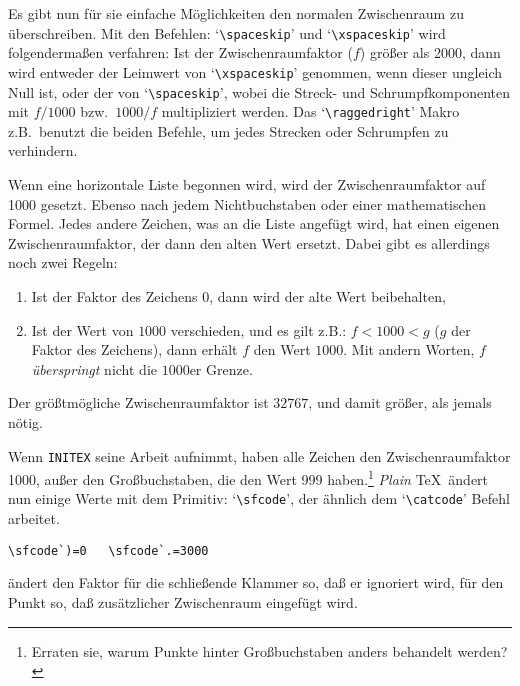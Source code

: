 Es gibt nun f\"ur sie einfache M\"oglichkeiten den normalen Zwischenraum
zu \"uberschreiben. Mit den Befehlen: 
`\verb|\spaceskip|' und `\verb|\xspaceskip|' wird folgenderma\ss{}en verfahren:
Ist der
Zwischenraumfaktor ($f$) gr\"o\ss{}er als 2000, dann wird entweder der
Leimwert von 
`\verb|\xspaceskip|' genommen, wenn dieser ungleich Null
ist, oder der von `\verb|\spaceskip|', wobei die Streck- und
Schrumpfkomponenten mit $f/1000$ bzw.\ $1000/f$ multipliziert werden.
Das 
`\verb|\raggedright|' Makro z.B.\ benutzt die beiden Befehle, um
jedes Strecken oder Schrumpfen zu verhindern.

Wenn eine horizontale 
Liste begonnen wird, wird der 
Zwischenraumfaktor
auf 1000 gesetzt. Ebenso nach jedem 
Nichtbuchstaben oder einer
mathematischen Formel. Jedes andere Zeichen, was an die Liste angef\"ugt
wird, hat einen eigenen Zwischenraumfaktor, der dann den alten Wert
ersetzt. Dabei gibt es allerdings noch zwei Regeln:
\begin{enumerate}
\item Ist der Faktor des Zeichens 0, dann wird der alte Wert
beibehalten,
\item Ist der Wert von $1000$ verschieden, und es gilt z.B.: $f<1000<g$
($g$ der Faktor des Zeichens), dann erh\"alt $f$ den Wert $1000$. Mit
andern Worten, $f$ {\em \"uberspringt} nicht die $1000$er Grenze.
\end{enumerate}
Der gr\"o\ss{}tm\"ogliche Zwischenraumfaktor ist $32767$, und damit gr\"o\ss{}er,
als jemals n\"otig.

Wenn {\tt INITEX} seine Arbeit aufnimmt, haben alle Zeichen den
Zwischenraumfaktor 1000, au\ss{}er den
Gro\ss{}buchstaben, die den Wert 999
haben.\footnote{Erraten sie, warum 
Punkte hinter Gro\ss{}buchstaben anders
behandelt werden?} {\em Plain} \TeX\ \"andert nun einige Werte mit dem
Primitiv: 
`\verb|\sfcode|', der \"ahnlich dem `\verb|\catcode|' Befehl
arbeitet.
\begin{verbatim}
\sfcode`)=0   \sfcode`.=3000
\end{verbatim}
\"andert den Faktor f\"ur die schlie\ss{}ende 
Klammer so, da\ss{} er ignoriert
wird, f\"ur den 
Punkt so, da\ss{} zus\"atzlicher Zwischenraum eingef\"ugt wird.

